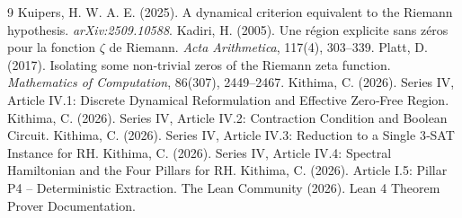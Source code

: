 \documentclass[11pt,a4paper]{article}
\begin{document}

\begin{thebibliography}{9}
  Kuipers, H. W. A. E. (2025). A dynamical criterion equivalent to the Riemann hypothesis. \emph{arXiv:2509.10588}.
  Kadiri, H. (2005). Une région explicite sans zéros pour la fonction $\zeta$ de Riemann. \emph{Acta Arithmetica}, 117(4), 303–339.
  Platt, D. (2017). Isolating some non‑trivial zeros of the Riemann zeta function. \emph{Mathematics of Computation}, 86(307), 2449–2467.
  Kithima, C. (2026). Series IV, Article IV.1: Discrete Dynamical Reformulation and Effective Zero‑Free Region.
  Kithima, C. (2026). Series IV, Article IV.2: Contraction Condition and Boolean Circuit.
  Kithima, C. (2026). Series IV, Article IV.3: Reduction to a Single 3‑SAT Instance for RH.
  Kithima, C. (2026). Series IV, Article IV.4: Spectral Hamiltonian and the Four Pillars for RH.
  Kithima, C. (2026). Article I.5: Pillar P4 – Deterministic Extraction.
  The Lean Community (2026). Lean 4 Theorem Prover Documentation.
\end{thebibliography}
\end{document}
